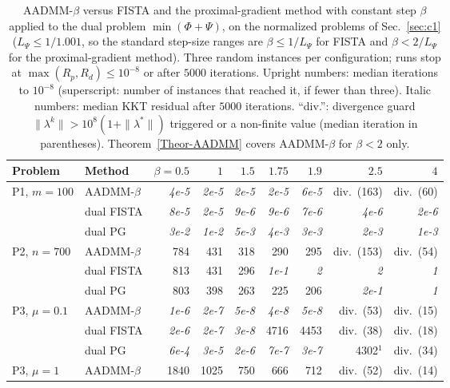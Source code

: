 \begin{table}[htbp]
\centering
\caption{AADMM-$\beta$ versus FISTA and the proximal-gradient method with constant step $\beta$ applied to the dual problem $\min(\Phi+\Psi)$, on the normalized problems of Sec.~\ref{sec:c1} ($L_\Psi\le1/1.001$, so the standard step-size ranges are $\beta\le1/L_\Psi$ for FISTA and $\beta<2/L_\Psi$ for the proximal-gradient method). Three random instances per configuration; runs stop at $\max(R_p,R_d)\le10^{-8}$ or after $5000$ iterations. Upright numbers: median iterations to $10^{-8}$ (superscript: number of instances that reached it, if fewer than three). Italic numbers: median KKT residual after $5000$ iterations. ``div.'': divergence guard $\|\lambda^k\|>10^{8}(1+\|\lambda^{*}\|)$ triggered or a non-finite value (median iteration in parentheses). Theorem~\ref{Theor-AADMM} covers AADMM-$\beta$ for $\beta<2$ only.}\label{tab:dualfista}
\scriptsize\setlength{\tabcolsep}{3pt}
\begin{tabular}{llrrrrrrr}
\toprule
Problem & Method & $\beta{=}0.5$ & $1$ & $1.5$ & $1.75$ & $1.9$ & $2.5$ & $4$ \\
\midrule
P1, $m{=}100$ & AADMM-$\beta$ & \textit{4e-5} & \textit{2e-5} & \textit{2e-5} & \textit{2e-5} & \textit{6e-5} & div.\ (163) & div.\ (60) \\
 & dual FISTA & \textit{8e-5} & \textit{2e-5} & \textit{9e-6} & \textit{9e-6} & \textit{7e-6} & \textit{4e-6} & \textit{2e-6} \\
 & dual PG & \textit{3e-2} & \textit{1e-2} & \textit{5e-3} & \textit{4e-3} & \textit{3e-3} & \textit{2e-3} & \textit{1e-3} \\
\addlinespace[2pt]
P2, $n{=}700$ & AADMM-$\beta$ & 784 & 431 & 318 & 290 & 295 & div.\ (153) & div.\ (54) \\
 & dual FISTA & 813 & 431 & 296 & \textit{1e-1} & \textit{2} & \textit{2} & \textit{1} \\
 & dual PG & 803 & 398 & 263 & 225 & 206 & \textit{2e-1} & \textit{1} \\
\addlinespace[2pt]
P3, $\mu{=}0.1$ & AADMM-$\beta$ & \textit{1e-6} & \textit{2e-7} & \textit{5e-8} & \textit{4e-8} & \textit{5e-8} & div.\ (53) & div.\ (15) \\
 & dual FISTA & \textit{2e-6} & \textit{2e-7} & \textit{3e-8} & 4716 & 4453 & div.\ (38) & div.\ (18) \\
 & dual PG & \textit{6e-4} & \textit{3e-5} & \textit{2e-6} & \textit{7e-7} & \textit{3e-7} & 4302$^{1}$ & div.\ (34) \\
\addlinespace[2pt]
P3, $\mu{=}1$ & AADMM-$\beta$ & 1840 & 1025 & 750 & 666 & 712 & div.\ (52) & div.\ (14) \\

\end{tabular}
\end{table}

